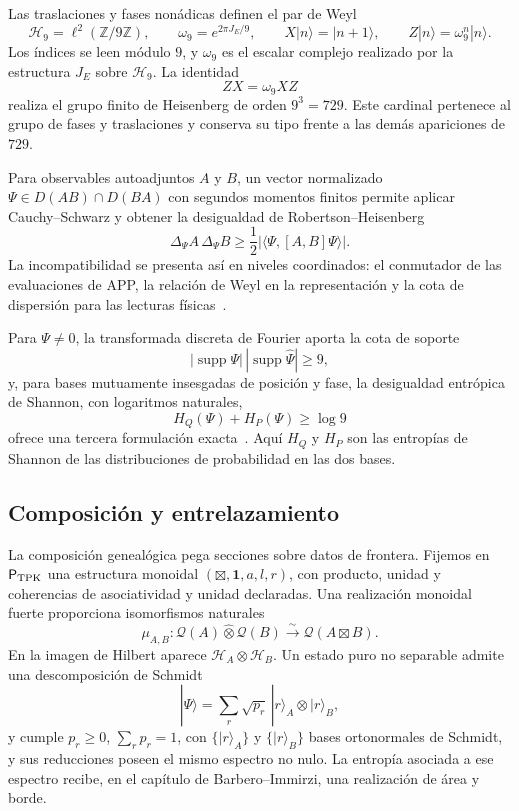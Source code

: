 Las traslaciones y fases nonádicas definen el par de Weyl
\[
 \mathcal H_9=\ell^2(\mathbb Z/9\mathbb Z),
 \qquad
 \omega_9=e^{2\pi J_E/9},
 \qquad
 X|n\rangle=|n+1\rangle,
 \qquad
 Z|n\rangle=\omega_9^n|n\rangle.
\]
Los índices se leen módulo \(9\), y \(\omega_9\) es el escalar complejo
realizado por la estructura \(J_E\) sobre \(\mathcal H_9\).
La identidad
\[
 ZX=\omega_9XZ
\]
realiza el grupo finito de Heisenberg de orden \(9^3=729\). Este cardinal
pertenece al grupo de fases y traslaciones y conserva su tipo frente a las
demás apariciones de \(729\).

Para observables autoadjuntos \(A\) y \(B\), un vector normalizado
\(\Psi\in D(AB)\cap D(BA)\) con segundos momentos finitos permite aplicar
Cauchy--Schwarz y obtener la
desigualdad de Robertson--Heisenberg
\begin{equation}
 \Delta_\Psi A\,\Delta_\Psi B
 \geq\frac12
 \bigl|\langle\Psi,[A,B]\Psi\rangle\bigr|.
 \label{eq:robertson-hmt-rev2}
\end{equation}
La incompatibilidad se presenta así en niveles coordinados: el conmutador de
las evaluaciones de APP, la relación de Weyl en la representación y la cota
de dispersión para las lecturas físicas~\cite{Heisenberg1927,Robertson1929}.

Para \(\Psi\neq0\), la transformada discreta de Fourier aporta la cota de soporte
\[
 |\operatorname{supp}\Psi|\,
 |\operatorname{supp}\widehat\Psi|\geq9,
\]
y, para bases mutuamente insesgadas de posición y fase, la desigualdad
entrópica de Shannon, con logaritmos naturales,
\[
 H_Q(\Psi)+H_P(\Psi)\geq\log9
\]
ofrece una tercera formulación exacta~\cite{MaassenUffink1988}. Aquí
\(H_Q\) y \(H_P\) son las entropías de Shannon de las distribuciones de
probabilidad en las dos bases.

\subsection{Composición y entrelazamiento}

La composición genealógica pega secciones sobre datos de frontera. Fijemos
en \(\mathsf P_{\rm TPK}\) una estructura monoidal
\((\boxtimes,\mathbf 1,a,l,r)\), con producto, unidad y coherencias de
asociatividad y unidad declaradas. Una realización monoidal fuerte
proporciona isomorfismos naturales
\[
 \mu_{A,B}:
 \mathcal Q(A)\widehat\otimes\mathcal Q(B)
 \xrightarrow{\sim}\mathcal Q(A\boxtimes B).
\]
En la imagen de Hilbert aparece
\(\mathcal H_A\otimes\mathcal H_B\). Un estado puro no separable admite una
descomposición de Schmidt
\[
 |\Psi\rangle
 =\sum_r\sqrt{p_r}\,|r\rangle_A\otimes|r\rangle_B,
\]
y cumple \(p_r\geq0\), \(\sum_rp_r=1\), con
\(\{|r\rangle_A\}\) y \(\{|r\rangle_B\}\) bases ortonormales de Schmidt,
y sus reducciones poseen el mismo espectro no nulo. La entropía asociada a
ese espectro recibe, en el capítulo de Barbero--Immirzi, una realización de
área y borde.

